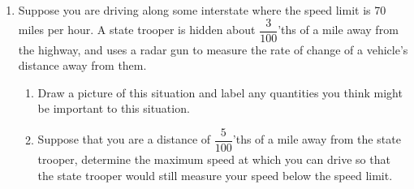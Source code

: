 \documentclass[12pt]{exam}
\begin{document}
\begin{enumerate}
\begin{enumerate}
\begin{enumerate}
\item How fast is the distance from the television camera to the rocket changing at that moment? 

\vfill

\item If the camera is following the rocket, how fast is the camera’s angle of elevation changing at that same moment?

\vfill

\end{enumerate}

\item If from an elevation of 3000 feet onward the rocket continues to rise at 600 feet/sec, will the rate of change of distance with respect to time be greater when the elevation is 4000 feet than it was at 3000 feet, or less? Why?

\vfill

\end{enumerate}

\newpage

\item Suppose you are driving along some interstate where the speed limit is 70 miles per hour. A state trooper is hidden about $\dfrac{3}{100}$'ths of a mile away from the highway, and uses a radar gun to measure the rate of change of a vehicle's distance away from them.

\begin{enumerate}
  \item Draw a picture of this situation and label any quantities you think might be important to this situation.
    \vfill

  \item Suppose that you are a distance of $\dfrac{5}{100}$'ths of a mile away from the state trooper,
    determine the maximum speed at which you can drive so that the state trooper
    would still measure your speed below the speed limit.
    \vfill
\end{enumerate}

\end{enumerate}



\end{document}
